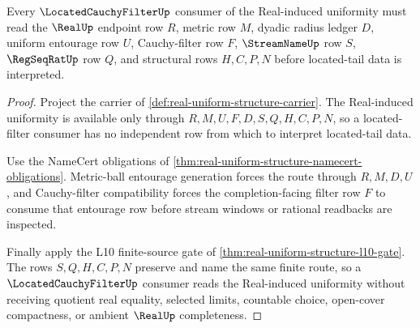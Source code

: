 \begin{theorem}
\label{thm:real-uniform-structure-located-filter-compatibility}
Every $\LocatedCauchyFilterUp$ consumer of the Real-induced uniformity must read the $\RealUp$ endpoint row $R$, metric row $M$, dyadic radius ledger $D$, uniform entourage row $U$, Cauchy-filter row $F$, $\StreamNameUp$ row $S$, $\RegSeqRatUp$ row $Q$, and structural rows $H,C,P,N$ before located-tail data is interpreted.
\end{theorem}
\begin{proof}
Project the carrier of \autoref{def:real-uniform-structure-carrier}. The Real-induced uniformity is available only through $R,M,U,F,D,S,Q,H,C,P,N$, so a located-filter consumer has no independent row from which to interpret located-tail data.

Use the NameCert obligations of \autoref{thm:real-uniform-structure-namecert-obligations}. Metric-ball entourage generation forces the route through $R,M,D,U$, and Cauchy-filter compatibility forces the completion-facing filter row $F$ to consume that entourage row before stream windows or rational readbacks are inspected.

Finally apply the L10 finite-source gate of \autoref{thm:real-uniform-structure-l10-gate}. The rows $S,Q,H,C,P,N$ preserve and name the same finite route, so a $\LocatedCauchyFilterUp$ consumer reads the Real-induced uniformity without receiving quotient real equality, selected limits, countable choice, open-cover compactness, or ambient $\RealUp$ completeness.
\end{proof}

